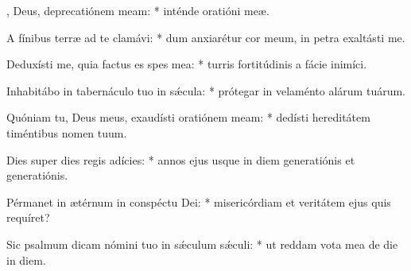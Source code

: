 \begin{psalmus}
        
    , Deus, deprecatiónem meam: * inténde oratióni meæ.
        
    A fínibus terræ ad te clamávi: * dum anxiarétur cor meum, in petra exaltásti me.
        
    Deduxísti me, quia factus es spes mea: * turris fortitúdinis a fácie inimíci.
        
    Inhabitábo in tabernáculo tuo in sǽcula: * prótegar in velaménto alárum tuárum.
        
    Quóniam tu, Deus meus, exaudísti oratiónem meam: * dedísti hereditátem timéntibus nomen tuum.
        
    Dies super dies regis adícies: * annos ejus usque in diem generatiónis et generatiónis.
        
    Pérmanet in ætérnum in conspéctu Dei: * misericórdiam et veritátem ejus quis requíret?
        
    Sic psalmum dicam nómini tuo in sǽculum sǽculi: * ut reddam vota mea de die in diem.
        
    \end{psalmus}
